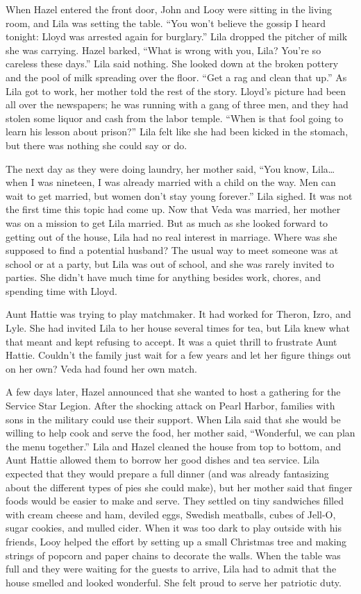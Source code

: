 \documentclass[
  letterpaper,
]{book}
\begin{document}
When Hazel entered the front door, John and Looy were sitting in the
living room, and Lila was setting the table. ``You won't believe the
gossip I heard tonight: Lloyd was arrested again for burglary.'' Lila
dropped the pitcher of milk she was carrying. Hazel barked, ``What is
wrong with you, Lila? You're so careless these days.'' Lila said
nothing. She looked down at the broken pottery and the pool of milk
spreading over the floor. ``Get a rag and clean that up.'' As Lila got
to work, her mother told the rest of the story. Lloyd's picture had been
all over the newspapers; he was running with a gang of three men, and
they had stolen some liquor and cash from the labor temple. ``When is
that fool going to learn his lesson about prison?'' Lila felt like she
had been kicked in the stomach, but there was nothing she could say or
do.

The next day as they were doing laundry, her mother said, ``You know,
Lila\ldots when I was nineteen, I was already married with a child on
the way. Men can wait to get married, but women don't stay young
forever.'' Lila sighed. It was not the first time this topic had come
up. Now that Veda was married, her mother was on a mission to get Lila
married. But as much as she looked forward to getting out of the house,
Lila had no real interest in marriage. Where was she supposed to find a
potential husband? The usual way to meet someone was at school or at a
party, but Lila was out of school, and she was rarely invited to
parties. She didn't have much time for anything besides work, chores,
and spending time with Lloyd.

Aunt Hattie was trying to play matchmaker. It had worked for Theron,
Izro, and Lyle. She had invited Lila to her house several times for tea,
but Lila knew what that meant and kept refusing to accept. It was a
quiet thrill to frustrate Aunt Hattie. Couldn't the family just wait for
a few years and let her figure things out on her own? Veda had found her
own match.

A few days later, Hazel announced that she wanted to host a gathering
for the Service Star Legion. After the shocking attack on Pearl Harbor,
families with sons in the military could use their support. When Lila
said that she would be willing to help cook and serve the food, her
mother said, ``Wonderful, we can plan the menu together.'' Lila and
Hazel cleaned the house from top to bottom, and Aunt Hattie allowed them
to borrow her good dishes and tea service. Lila expected that they would
prepare a full dinner (and was already fantasizing about the different
types of pies she could make), but her mother said that finger foods
would be easier to make and serve. They settled on tiny sandwiches
filled with cream cheese and ham, deviled eggs, Swedish meatballs, cubes
of Jell-O, sugar cookies, and mulled cider. When it was too dark to play
outside with his friends, Looy helped the effort by setting up a small
Christmas tree and making strings of popcorn and paper chains to
decorate the walls. When the table was full and they were waiting for
the guests to arrive, Lila had to admit that the house smelled and
looked wonderful. She felt proud to serve her patriotic duty.
\end{document}
